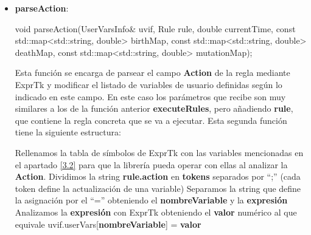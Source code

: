 \begin{itemize}
\begin{itemize}
	\end{itemize}
Conociendo estos datos, la función opera de la siguiente manera:
	\begin{algorithm}
		\caption{executeRules}
		\begin{algorithmic}
			\STATE Rellenamos la tabla de símbolos de ExprTk con las variables mencionadas en el apartado \ref{3.2} para que la librería pueda operar con ellas al analizar la \textbf{Condition}.
				\STATE Analizamos \textbf{regla.Condition} con ExprTk obteniendo \textbf{true/false}
					\STATE Llamamos a \textbf{parseAction}
				\ENDIF
			\ENDFOR
		\end{algorithmic}
	\end{algorithm}
	\item \textbf{parseAction}:
	
	\begin{CPP}
	void parseAction(UserVarsInfo& uvif, 
	                    Rule rule,  
	                    double currentTime,
	                    const std::map<std::string, double> birthMap,
	                    const std::map<std::string, double> deathMap,
	                    const std::map<std::string, double> mutationMap);
	\end{CPP}
	
	Esta función se encarga de parsear el campo \textbf{Action} de la regla mediante ExprTk\cite{Exprtk} y modificar el listado de variables de usuario definidas según lo indicado en este campo. 
	En este caso los parámetros que recibe son muy similares a los de la función anterior \textbf{executeRules}, pero añadiendo \textbf{rule}, que contiene la regla concreta que se va a ejecutar.
	Esta segunda función tiene la siguiente estructura:
	
	\begin{algorithm}
		\caption{executeRules}
		\begin{algorithmic}
			\STATE Rellenamos la tabla de símbolos de ExprTk con las variables mencionadas en el apartado \ref{3.2} para que la librería pueda operar con ellas al analizar la \textbf{Action}.
			\STATE Dividimos la string \textbf{rule.action} en \textbf{tokens} separados por ``;'' (cada token define la actualización de una variable)
			\FOR{\textbf{each} token}
				\STATE Separamos la string que define la asignación por el ``='' obteniendo el \textbf{nombreVariable} y la \textbf{expresión}
				\STATE Analizamos la \textbf{expresión} con ExprTk obteniendo el \textbf{valor} numérico al que equivale
				\STATE uvif.userVars[\textbf{nombreVariable}] = \textbf{valor}
			\ENDFOR
		\end{algorithmic}
	\end{algorithm}
\end{itemize}

